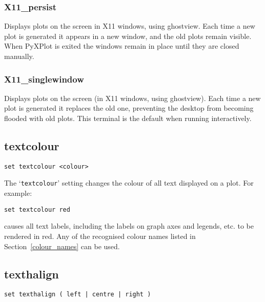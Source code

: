 \documentclass[a4paper,onecolumn,11pt]{book}
\begin{document}
\subsubsection{X11\_persist}

Displays plots on the screen in X11 windows, using ghostview.  Each time a new
plot is generated it appears in a new window, and the old plots remain visible.
When PyXPlot is exited the windows remain in place until they are closed
manually.

\subsubsection{X11\_singlewindow}

Displays plots on the screen (in X11 windows, using ghostview). Each time a new
plot is generated it replaces the old one, preventing the desktop from becoming
flooded with old plots. This terminal is the default when running
interactively.

\subsection{textcolour}

\begin{verbatim}
set textcolour <colour>
\end{verbatim}

The `{\tt textcolour}' setting changes the colour of all text displayed on a plot.
For example:

\begin{verbatim}
set textcolour red
\end{verbatim}

\noindent causes all text labels, including the labels on graph axes and
legends, etc. to be rendered in red. Any of the recognised colour names listed
in Section~\ref{colour_names} can be used.

\subsection{texthalign}

\begin{verbatim}
set texthalign ( left | centre | right )
\end{verbatim}
\end{document}
